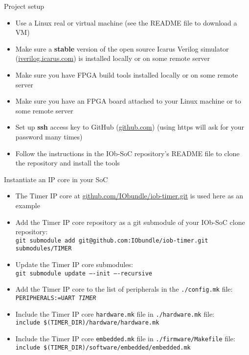 \documentclass [xcolor=svgnames, t] {beamer}
\begin{document}
\begin{frame}{Project setup}
\begin{center}
  \begin{itemize}
    \item Use a Linux real or virtual machine (see the README file to download a VM)
    \item Make sure a {\bf stable} version of the open source Icarus Verilog simulator (\url{iverilog.icarus.com}) is installed locally or on some remote server
    \item Make sure you have FPGA build tools installed locally or on some remote server
    \item Make sure you have an FPGA board attached to your Linux machine or to some remote server
    \item Set up {\bf ssh} access key to GitHub (\url{github.com}) (using https will ask for your password many times)
    \item Follow the instructions in the IOb-SoC repository's README file to clone the repository and install the tools
  \end{itemize}
\end{center}
\end{frame}


\begin{frame}{Instantiate an IP core in your SoC}
  \begin{itemize}
  \item The Timer IP core at \url{github.com/IObundle/iob-timer.git} is used here as an example
  \item Add the Timer IP core repository as a git submodule of your IOb-SoC clone repository:\\
    {\tt \tiny git submodule add git@github.com:IObundle/iob-timer.git submodules/TIMER}
  \item Update the Timer IP core submodules:\\
    {\tt \tiny git submodule update ----init ----recursive}
  \item Add the Timer IP core to the list of peripherals in the {\tt ./config.mk} file:\\
    {\tt PERIPHERALS:=UART {\em TIMER}}
  \item Include the Timer IP core {\tt hardware.mk} file in {\tt ./hardware.mk} file:\\
    {\tt \tiny include \$(TIMER\_DIR)/hardware/hardware.mk}
  \item Include the Timer IP core {\tt embedded.mk} file in {\tt ./firmware/Makefile} file:\\
    {\tt \tiny include \$(TIMER\_DIR)/software/embedded/embedded.mk}
  \end{itemize}
\end{frame}
\end{document}
